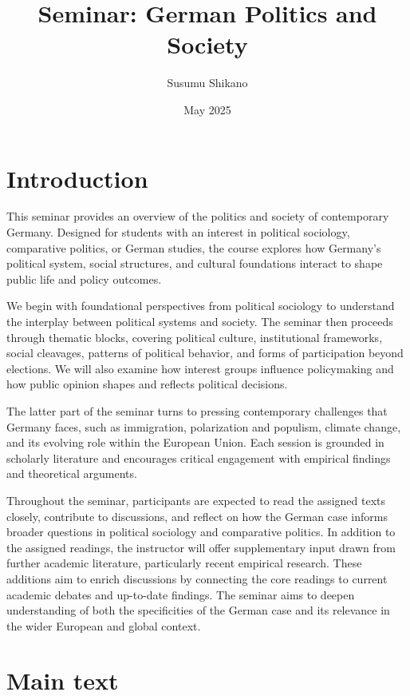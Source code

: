 \documentclass[12p,a4]{article}
\title{Seminar: German Politics and Society}
\author{Susumu  Shikano}
\date{May 2025}
\begin{document}
\maketitle

\section{Introduction}

This seminar provides an overview of the politics and society of contemporary Germany. Designed for students with an interest in political sociology, comparative politics, or German studies, the course explores how Germany’s political system, social structures, and cultural foundations interact to shape public life and policy outcomes.

We begin with foundational perspectives from political sociology to understand the interplay between political systems and society. The seminar then proceeds through thematic blocks, covering political culture, institutional frameworks, social cleavages, patterns of political behavior, and forms of participation beyond elections. We will also examine how interest groups influence policymaking and how public opinion shapes and reflects political decisions.

The latter part of the seminar turns to pressing contemporary challenges that Germany faces, such as immigration, polarization and populism, climate change, and its evolving role within the European Union. Each session is grounded in scholarly literature and encourages critical engagement with empirical findings and theoretical arguments.

Throughout the seminar, participants are expected to read the assigned texts closely, contribute to discussions, and reflect on how the German case informs broader questions in political sociology and comparative politics. In addition to the assigned readings, the instructor will offer supplementary input drawn from further academic literature, particularly recent empirical research. These additions aim to enrich discussions by connecting the core readings to current academic debates and up-to-date findings. The seminar  aims to deepen understanding of both the specificities of the German case and its relevance in the wider European and global context.

\section{Main text}
\end{document}
